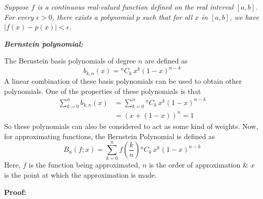 \documentclass[
]{book}
\begin{document}
\emph{Suppose \(f\) is a continuous real-valued function defined on the real interval \([a,b]\). For every \(\epsilon > 0\), there exists a polynomial \(p\) such that for all \(x\) in \([a,b]\), we have \(|f(x) - p(x)| < \epsilon\).}

\emph{\textbf{Bernstein polynomial:}}

The Bernstein basis polynomials of degree \(n\) are defined as
\begin{equation}
    b_{k,n}(x) = {}^nC_{k}\, x^k (1-x)^{n-k}
\end{equation}
A linear combination of these basis polynomials can be used to obtain other polynomials. One of the properties of these polynomials is that
\begin{equation}
\begin{aligned}
    \sum_{k=0}^n {b_{k,n}(x)} &= \sum_{k=0}^n {{}^nC_{k}\, x^k (1-x)^{n-k}} \\
    &= (x + (1 - x))^n = 1
    \label{equ:property}
\end{aligned}
\end{equation}
So these polynomials can also be considered to act as some kind of weights. Now, for approximating functions, the Bernstein Polynomial is defined as
\begin{equation}
    B_n(f;x) = \sum_{k=0}^n {f\left(\dfrac{k}{n}\right) {}^nC_{k}\, x^k (1-x)^{n-k}}
    \label{eqn:bern}
\end{equation}
Here, \(f\) is the function being approximated, \(n\) is the order of approximation \& \(x\) is the point at which the approximation is made.

\textbf{Proof:}
\end{document}
